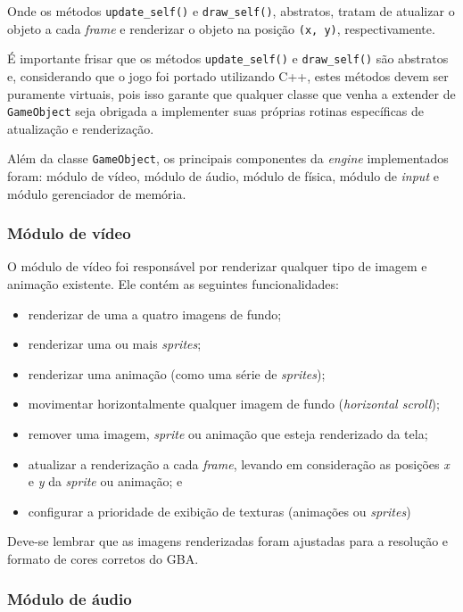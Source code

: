     Onde os métodos \texttt{update\_self()} e \texttt{draw\_self()}, abstratos, tratam de atualizar o objeto a cada \textit{frame} e renderizar o objeto na posição \texttt{(x, y)}, respectivamente.

    É importante frisar que os métodos \texttt{update\_self()} e \texttt{draw\_self()} são abstratos e, considerando que o jogo foi portado utilizando C++, estes métodos devem ser puramente virtuais, pois isso garante que qualquer classe que venha a extender de \texttt{GameObject} seja obrigada a implementer suas próprias rotinas específicas de atualização e renderização.

    Além da classe \texttt{GameObject}, os principais componentes da \textit{engine} implementados foram: módulo de vídeo, módulo de áudio, módulo de física, módulo de \textit{input} e módulo gerenciador de memória.

    \subsubsection{Módulo de vídeo}

      O módulo de vídeo foi responsável por renderizar qualquer tipo de imagem e animação existente. Ele contém as seguintes funcionalidades:

      \begin{itemize}
        \item renderizar de uma a quatro imagens de fundo;
        \item renderizar uma ou mais \textit{sprites};
        \item renderizar uma animação (como uma série de \textit{sprites});
        \item movimentar horizontalmente qualquer imagem de fundo (\textit{horizontal scroll});
        \item remover uma imagem, \textit{sprite} ou animação que esteja renderizado da tela;
        \item atualizar a renderização a cada \textit{frame}, levando em consideração as posições \textit{x} e \textit{y} da \textit{sprite} ou animação; e
        \item configurar a prioridade de exibição de texturas (animações ou \textit{sprites})
      \end{itemize}

      Deve-se lembrar que as imagens renderizadas foram ajustadas para a resolução e formato de cores corretos do GBA.

    \subsubsection{Módulo de áudio}

